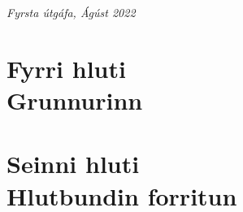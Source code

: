 \documentclass[11pt,fleqn]{book} %
\begin{document}
\noindent \textit{Fyrsta útgáfa, Ágúst 2022} %


\usechapterimagetrue %


\pagestyle{empty} %

\tableofcontents %

\cleardoublepage %

\pagestyle{fancy} %


\part{Fyrri hluti\\ Grunnurinn}






















\part{Seinni hluti\\ Hlutbundin forritun}\label{Seinni hluti - hlutbundin forritun}
\end{document}
